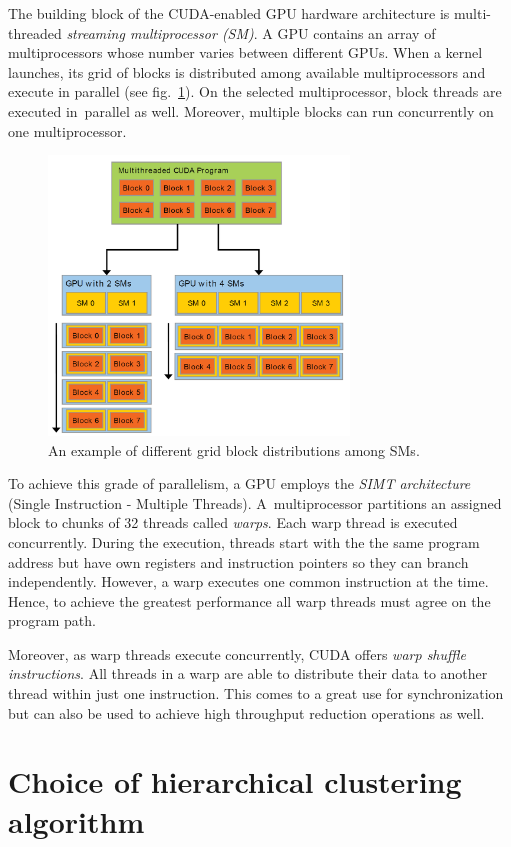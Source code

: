The building block of the CUDA-enabled GPU hardware architecture is multi-threaded \emph{streaming multiprocessor (SM)}. A GPU contains an array of multiprocessors whose number varies between different GPUs. When a kernel launches, its grid of blocks is distributed among available multiprocessors and execute in parallel (see fig.~\ref{fig02:SM}). On the selected multiprocessor, block threads are executed in~parallel as well. Moreover, multiple blocks can run concurrently on one multiprocessor.

\begin{figure}\centering
	\includegraphics[width=8cm]{img/SM}
	\caption{An example of different grid block distributions among SMs.}
	\label{fig02:SM}
\end{figure}

To achieve this grade of parallelism, a GPU employs the \emph{SIMT architecture} (Single Instruction - Multiple Threads). A~multiprocessor partitions an assigned block to chunks of 32 threads called \emph{warps}. Each warp thread is executed concurrently. During the execution, threads start with the the same program address but have own registers and instruction pointers so they can branch independently. However, a warp executes one common instruction at the time. Hence, to achieve the greatest performance all warp threads must agree on the program path.

Moreover, as warp threads execute concurrently, CUDA offers \emph{warp shuffle instructions}. All threads in a warp are able to distribute their data to another thread within just one instruction. This comes to a great use for synchronization but can also be used to achieve high throughput reduction operations as well.


\section{Choice of hierarchical clustering algorithm}

